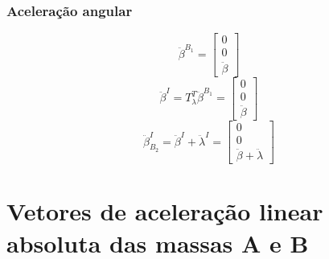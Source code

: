 \documentclass[a4paper, 12pt]{article}
\begin{document}
	\subsubsection{Aceleração angular}
		\begin{equation}
			\ddot{\beta}^{B_1} = \begin{bmatrix}
			0\\0\\ \ddot{\beta}
			\end{bmatrix}
		\end{equation}
		\begin{equation}
			\ddot{\beta}^{I} = T^T_{\lambda} \ddot{\beta}^{B_1} = \begin{bmatrix}
			0\\0\\ \ddot{\beta}
			\end{bmatrix}
		\end{equation}
		\begin{equation}
			\ddot{\beta}^{I}_{B_2}= \ddot{\beta}^{I} + \ddot{\lambda}^{I} = \begin{bmatrix}
			0\\0\\ \ddot{\beta} + \ddot{\lambda}
			\end{bmatrix}
		\end{equation}
			
			
\section{Vetores de aceleração linear absoluta das massas A e B}
\end{document}
